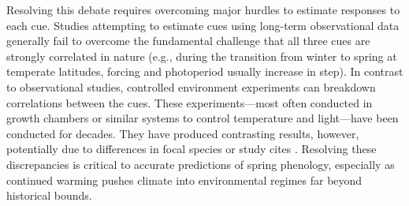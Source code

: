\documentclass{article}
\begin{document}
\par Resolving this debate requires overcoming major hurdles to estimate responses to each cue. Studies attempting to estimate cues using long-term observational data \citep[e.g.,][]{vitasse2013, zohner2016} generally fail to overcome the fundamental challenge that all three cues are strongly correlated in nature (e.g., during the transition from winter to spring at temperate latitudes, forcing and photoperiod usually increase in step). In contrast to observational studies, controlled environment experiments can breakdown correlations between the cues. These experiments---most often conducted in growth chambers or similar systems to control temperature and light---have been conducted for decades. They have produced contrasting results, however, potentially  due to differences in focal species or study cites \citep{zohner2016,Laube:2014a,Basler:2012,Caffarra:2011b,Caffarra:2011a}. Resolving these discrepancies is critical to accurate predictions of spring phenology, especially as continued warming pushes climate into environmental regimes far beyond historical bounds. 

\end{document}

